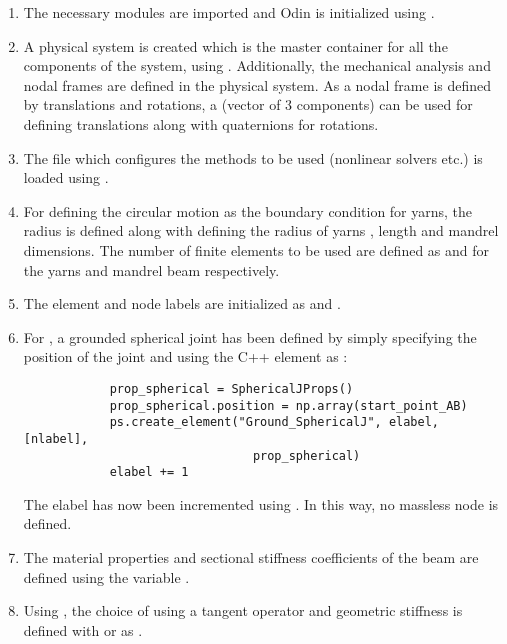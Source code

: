 \begin{enumerate}
    \item The necessary modules are imported and Odin is initialized using .
    \item A physical system is created which is the master container for all the components of the system, using . Additionally, the mechanical analysis and nodal frames are defined in the physical system. As a nodal frame is defined by translations and rotations, a  (vector of 3 components) can be used for defining translations along with quaternions for rotations.
    \item The  file which configures the methods to be used (nonlinear solvers etc.) is loaded using .
    \item For defining the circular motion as the boundary condition for yarns, the radius  is defined along with defining the radius of yarns , length  and mandrel dimensions. The number of finite elements to be used are defined as  and  for the yarns and mandrel beam respectively.
    \item The element and node labels are initialized as  and .
    \item For , a grounded spherical joint has been defined by simply specifying the position of the joint and using the C++ element  as :
        \pythonstyle
        \begin{tcolorbox}\begin{lstlisting}
            prop_spherical = SphericalJProps()
            prop_spherical.position = np.array(start_point_AB)
            ps.create_element("Ground_SphericalJ", elabel, [nlabel],
                                prop_spherical)
            elabel += 1 
        \end{lstlisting}\end{tcolorbox}
        The elabel has now been incremented using . In this way, no massless node is defined.
    \item The material properties and sectional stiffness coefficients of the beam are defined using the variable . 
    \item Using , the choice of using a tangent operator and geometric stiffness is defined with  or  as .

\end{enumerate}
